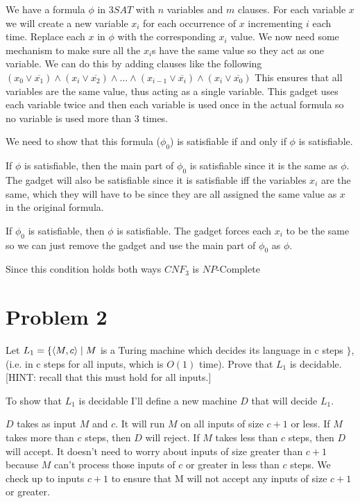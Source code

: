 \documentclass[12pt]{article}
\begin{document}
We have a formula $\phi$ in $3SAT$ with $n$ variables and $m$ clauses. For each variable $x$ we will create a new variable $x_i$ for each occurrence of $x$ incrementing $i$ each time. Replace each $x$ in $\phi$ with the corresponding $x_i$ value. We now need some mechanism to make sure all the $x_i$s have the same value so they act as one variable. We can do this by adding clauses like the following $ (x_0 \lor \overline{x_1}) \land (x_i \lor \overline{x_2}) \land \dots \land (x_{i-1} \lor \overline{x_i}) \land (x_i \lor \overline{x_{0}})$ This ensures that all variables are the same value, thus acting as a single variable. This gadget uses each variable twice and then each variable is used once in the actual formula so no variable is used more than 3 times.

We need to show that this formula ($\phi_0$) is satisfiable if and only if $\phi$ is satisfiable.

If $\phi$ is satisfiable, then the main part of $\phi_0$ is satisfiable since it is the same as $\phi$. The gadget will also be satisfiable since it is satisfiable iff the variables $x_i$ are the same, which they will have to be since they are all assigned the same value as $x$ in the original formula.

If $\phi_0$ is satisfiable, then $\phi$ is satisfiable. The gadget forces each $x_i$ to be the same so we can just remove the gadget and use the main part of $\phi_0$ as $\phi$.

Since this condition holds both ways $CNF_3$ is $NP$-Complete


\section*{Problem 2}

\begin{questionbox}
	Let $L_1 = \{ \braket{M,c} \mid M$ is a Turing machine which decides its language in c steps $\}$, (i.e. in c
	steps for all inputs, which is $O(1)$ time). Prove that $L_1$ is decidable. [HINT: recall that this
	must hold for all inputs.]
\end{questionbox}

To show that $L_1$ is decidable I'll define a new machine $D$ that will decide $L_1$.

$D$ takes as input $M$ and $c$. It will run $M$ on all inputs of size $c+1$ or less. If $M$ takes more than $c$ steps, then $D$ will reject. If $M$ takes less than $c$ steps, then $D$ will accept. It doesn't need to worry about inputs of size greater than $c+1$ because $M$ can't process those inputs of $c$ or greater in less than $c$ steps. We check up to inputs $c+1$ to ensure that M will not accept any inputs of size $c+1$ or greater.
\end{document}
